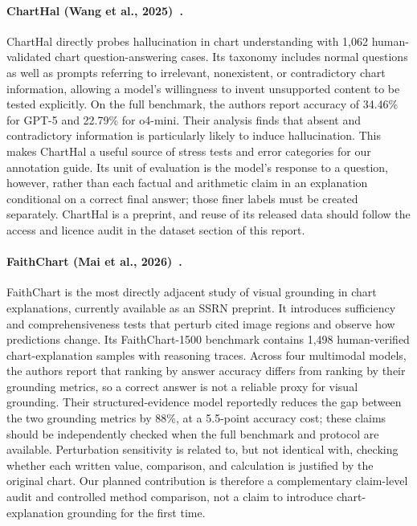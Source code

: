 \paragraph{ChartHal (Wang et al., 2025)~\cite{wang2025charthal}.} ChartHal directly probes hallucination in chart understanding with 1,062 human-validated chart question-answering cases. Its taxonomy includes normal questions as well as prompts referring to irrelevant, nonexistent, or contradictory chart information, allowing a model's willingness to invent unsupported content to be tested explicitly. On the full benchmark, the authors report accuracy of 34.46\% for GPT-5 and 22.79\% for o4-mini. Their analysis finds that absent and contradictory information is particularly likely to induce hallucination. This makes ChartHal a useful source of stress tests and error categories for our annotation guide. Its unit of evaluation is the model's response to a question, however, rather than each factual and arithmetic claim in an explanation conditional on a correct final answer; those finer labels must be created separately. ChartHal is a preprint, and reuse of its released data should follow the access and licence audit in the dataset section of this report.

\paragraph{FaithChart (Mai et al., 2026)~\cite{mai2026faithchart}.} FaithChart is the most directly adjacent study of visual grounding in chart explanations, currently available as an SSRN preprint. It introduces sufficiency and comprehensiveness tests that perturb cited image regions and observe how predictions change. Its FaithChart-1500 benchmark contains 1,498 human-verified chart-explanation samples with reasoning traces. Across four multimodal models, the authors report that ranking by answer accuracy differs from ranking by their grounding metrics, so a correct answer is not a reliable proxy for visual grounding. Their structured-evidence model reportedly reduces the gap between the two grounding metrics by 88\%, at a 5.5-point accuracy cost; these claims should be independently checked when the full benchmark and protocol are available. Perturbation sensitivity is related to, but not identical with, checking whether each written value, comparison, and calculation is justified by the original chart. Our planned contribution is therefore a complementary claim-level audit and controlled method comparison, not a claim to introduce chart-explanation grounding for the first time.

